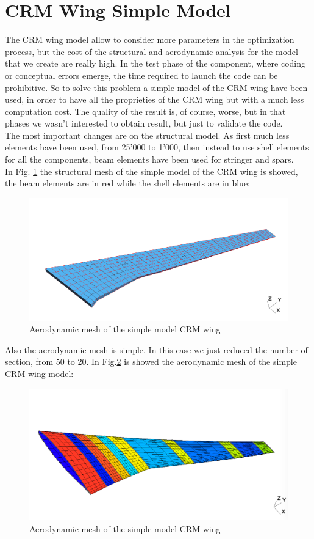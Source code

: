 \section{CRM Wing Simple Model}
The CRM wing model allow to consider more parameters in the optimization process, but the cost of the structural and aerodynamic analysis for the model that we create are really high. In the test phase of the component, where coding or conceptual errors emerge, the time required to launch the code can be prohibitive. So to solve this problem a simple model of the CRM wing have been used, in order to have all the proprieties of the CRM wing but with a much less computation cost. The quality of the result is, of course, worse, but in that phases we wasn't interested to obtain result, but just to validate the code.\\
The most important changes are on the structural model. As first much less elements have been used, from 25'000 to 1'000, then instead to use shell elements for all the components, beam elements have been used for stringer and spars.\\
In Fig. \ref{fig:5_7} the structural mesh of the simple model of the CRM wing is showed, the beam elements are in red while the shell elements are in blue:
\begin{figure}[H]
	\centering
	\includegraphics[width = 1\textwidth]{./Immagini/5_8.png}
	\caption{Aerodynamic mesh of the simple model CRM wing}
	\label{fig:5_7}
\end{figure}
Also the aerodynamic mesh is simple. In this case we just reduced the number of section, from 50 to 20. In Fig.\ref{fig:5_8} is showed the aerodynamic mesh of the simple CRM wing model:
\begin{figure}[H]
	\centering
	\includegraphics[width = 1\textwidth]{./Immagini/5_9.png}
	\caption{Aerodynamic mesh of the simple model CRM wing}
	\label{fig:5_8}
\end{figure}
